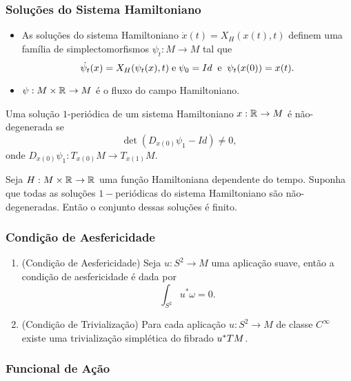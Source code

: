 \documentclass{beamer}
\begin{document}
\begin{footnotesize}
	\begin{frame}
		\frametitle{Soluções do Sistema Hamiltoniano}
		
		\begin{itemize}
			\item As soluções do sistema Hamiltoniano $\dot{x}(t)=X_{H}(x(t), t)$ definem uma família de simplectomorfismos $\psi_{t}:M\to M$ tal que
			$$
			\dot{\psi_{t}}(x) = X_{H}(\psi_{t}(x), t)\; \text{e} \; \psi_{0}=Id\;\;\text{e}\;\; \psi_{t}(x(0)) = x(t).
			$$
			
			\item $\psi :M\times \mathbb{R}^{} \to M$ é o fluxo do campo Hamiltoniano.
		\end{itemize}
		
		\begin{definicao}
			Uma solução $1$-periódica de um sistema Hamiltoniano $x: \mathbb{R}^{}\to M$ é não-degenerada se 
			$$
			\det(D_{x(0)}\psi_{1} - Id)\neq 0,
			$$
			onde $D_{x(0)}\psi_{1}:T_{x(0)}M \to T_{x(1)}M$.
		\end{definicao}
		
		\begin{proposicao}
			Seja $H:M\times\mathbb{R}^{}\to \mathbb{R}^{}$ uma função Hamiltoniana dependente do tempo. Suponha que todas as soluções $1-$periódicas do sistema Hamiltoniano são não-degeneradas. Então o conjunto dessas soluções é finito.
		\end{proposicao}
	\end{frame}

	\begin{frame}
		\frametitle{Condição de Aesfericidade}
			\begin{enumerate}
				
				\item (Condição de Aesfericidade) Seja $u:S^{2} \to M$ uma aplicação suave, então a condição de aesfericidade é dada por 
				$$
				\int_{S^{2}} u^{*}\omega = 0.
				$$
				
				\item (Condição de Trivialização) 
				Para cada aplicação $u:S^{2}\to M$ de classe $C^{\infty}$ existe uma trivialização simplética do fibrado $u^{*}TM$.
				
			\end{enumerate}
	\end{frame}
	
	\begin{frame}
		\frametitle{Funcional de Ação}
		

\end{frame}
\end{footnotesize}
\end{document}
